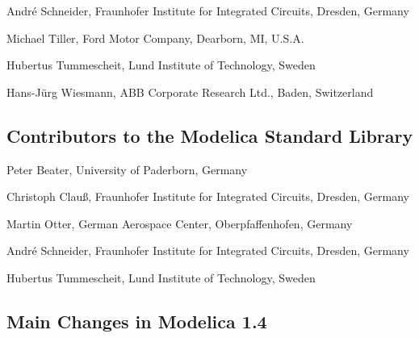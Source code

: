 André Schneider, Fraunhofer Institute for Integrated Circuits, Dresden,
Germany

Michael Tiller, Ford Motor Company, Dearborn, MI, U.S.A.

Hubertus Tummescheit, Lund Institute of Technology, Sweden

Hans-Jürg Wiesmann, ABB Corporate Research Ltd., Baden, Switzerland

\subsection{Contributors to the Modelica Standard Library}\label{contributors-to-the-modelica-standard-library}

\indent\indent
Peter Beater, University of Paderborn, Germany

Christoph Clauß, Fraunhofer Institute for Integrated Circuits, Dresden,
Germany

Martin Otter, German Aerospace Center, Oberpfaffenhofen, Germany

André Schneider, Fraunhofer Institute for Integrated Circuits, Dresden,
Germany

Hubertus Tummescheit, Lund Institute of Technology, Sweden

\subsection{Main Changes in Modelica 1.4}\label{main-changes-in-modelica-1-4}

